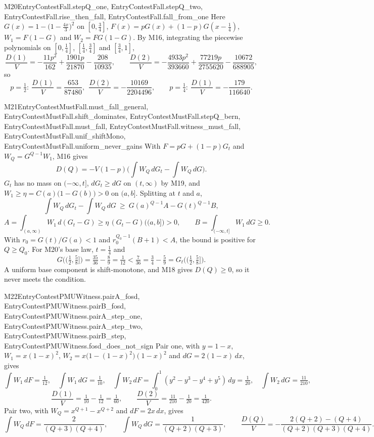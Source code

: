 \begin{mproof}{M20}{EntryContestFall.stepQ_one, EntryContestFall.stepQ_two, EntryContestFall.rise_then_fall, EntryContestFall.fall_from_one}
Here $G(x)=1-\big(1-\tfrac{4x}3\big)^2$ on $[0,\frac34]$,
$F(x)=pG(x)+(1-p)G(x-\frac14)$, $W_1=F(1-G)$ and $W_2=FG(1-G)$. By M16, integrating
the piecewise polynomials on $[0,\frac14]$, $[\frac14,\frac34]$ and $[\frac34,1]$,
\[
  \frac{D(1)}V=-\frac{11p^2}{162}+\frac{1901p}{21870}-\frac{208}{10935},\qquad
  \frac{D(2)}V=-\frac{4933p^2}{393660}+\frac{77219p}{2755620}-\frac{10672}{688905},
\]
so
\[
  p=\tfrac12:\ \frac{D(1)}V=\frac{653}{87480},\ \ \frac{D(2)}V=-\frac{10169}{2204496},
  \qquad p=\tfrac14:\ \frac{D(1)}V=-\frac{179}{116640}.
\]
\end{mproof}

\begin{mproof}{M21}{EntryContestMustFall.must_fall_general, EntryContestMustFall.shift_dominates, EntryContestMustFall.stepQ_bern, EntryContestMustFall.must_fall, EntryContestMustFall.witness_must_fall, EntryContestMustFall.unif_shiftMono, EntryContestMustFall.uniform_never_gains}
With $F=pG+(1-p)G_t$ and $W_Q=G^{Q-1}W_1$, M16 gives
\[
  D(Q)=-V(1-p)\Big(\int W_Q\,dG_t-\int W_Q\,dG\Big).
\]
$G_t$ has no mass on $(-\infty,t]$, $dG_t\ge dG$ on $(t,\infty)$ by M19, and
$W_1\ge\eta=C(a)\big(1-G(b)\big)>0$ on $(a,b]$. Splitting at $t$ and $a$,
\[
  \int W_Q\,dG_t-\int W_Q\,dG\ \ge\ G(a)^{Q-1}A-G(t)^{Q-1}B,
\]
\[
  A=\int_{(a,\infty)}W_1\,d(G_t-G)\ge\eta\,(G_t-G)\big((a,b]\big)>0,\qquad
  B=\int_{(-\infty,t]}W_1\,dG\ge0 .
\]
With $r_0=G(t)/G(a)<1$ and $r_0^{Q_0-1}(B+1)<A$, the bound is positive for
$Q\ge Q_0$. For M20's base law, $t=\frac14$ and
\[
  G\big((\tfrac12,\tfrac58]\big)=\tfrac{35}{36}-\tfrac89=\tfrac1{12}
  <\tfrac7{36}=\tfrac34-\tfrac59=G_t\big((\tfrac12,\tfrac58]\big).
\]
A uniform base component is shift-monotone, and M18 gives $D(Q)\ge0$, so it never
meets the condition.
\end{mproof}

\begin{mproof}{M22}{EntryContestPMUWitness.pairA_fosd, EntryContestPMUWitness.pairB_fosd, EntryContestPMUWitness.pairA_step_one, EntryContestPMUWitness.pairA_step_two, EntryContestPMUWitness.pairB_step, EntryContestPMUWitness.fosd_does_not_sign}
Pair one, with $y=1-x$, $W_1=x(1-x)^2$, $W_2=x\big(1-(1-x)^2\big)(1-x)^2$ and
$dG=2(1-x)\,dx$, gives
\[
  \int W_1\,dF=\tfrac1{12},\quad \int W_1\,dG=\tfrac1{10},\quad
  \int W_2\,dF=\int_0^1(y^2-y^3-y^4+y^5)\,dy=\tfrac1{20},\quad
  \int W_2\,dG=\tfrac{11}{210},
\]
\[
  \frac{D(1)}V=\tfrac1{10}-\tfrac1{12}=\tfrac1{60},\qquad
  \frac{D(2)}V=\tfrac{11}{210}-\tfrac1{20}=\tfrac1{420}.
\]
Pair two, with $W_Q=x^{Q+1}-x^{Q+2}$ and $dF=2x\,dx$, gives
\[
  \int W_Q\,dF=\frac2{(Q+3)(Q+4)},\qquad \int W_Q\,dG=\frac1{(Q+2)(Q+3)},\qquad
  \frac{D(Q)}V=-\frac{2(Q+2)-(Q+4)}{(Q+2)(Q+3)(Q+4)} .
\]
\end{mproof}

